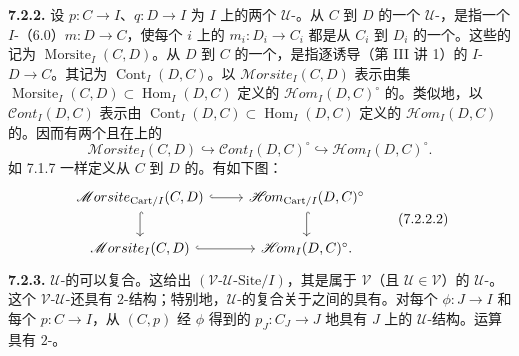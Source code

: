 \textbf{7.2.2.} 设 $p:C\to I$、$q:D\to I$ 为 $I$ 上的两个 $\mathcal U$-。从 $C$ 到 $D$ 的一个 $\mathcal U$-，是指一个 $I$-（6.0）$m:D\to C$，使每个 $i$ 上的 $m_i:D_i\to C_i$ 都是从 $C_i$ 到 $D_i$ 的一个。这些的记为 $\operatorname{Morsite}_I(C,D)$。从 $D$ 到 $C$ 的一个，是指逐诱导（第 III 讲 1）的 $I$- $D\to C$。其记为 $\operatorname{Cont}_I(D,C)$。以 $\mathscr{M}orsite_I(C,D)$ 表示由集 $\operatorname{Morsite}_I(C,D)\subset\operatorname{Hom}_I(D,C)$ 定义的 $\mathscr{H}\!om_I(D,C)^\circ$ 的。类似地，以 $\mathscr{C}ont_I(D,C)$ 表示由 $\operatorname{Cont}_I(D,C)\subset\operatorname{Hom}_I(D,C)$ 定义的 $\mathscr{H}\!om_I(D,C)$ 的。因而有两个且在上的
\[\mathscr{M}orsite_I(C,D)\hookrightarrow\mathscr{C}ont_I(D,C)^\circ\hookrightarrow\mathscr{H}\!om_I(D,C)^\circ.\tag{7.2.2.1}\]
如 7.1.7 一样定义从 $C$ 到 $D$ 的。有如下图：
\[\begin{tikzcd}
\mathscr{M}orsite_{\mathrm{Cart}/I}(C,D)\arrow[r,hook]\arrow[d,hook]&\mathscr{H}\!om_{\mathrm{Cart}/I}(D,C)^\circ\arrow[d,hook]\\
\mathscr{M}orsite_I(C,D)\arrow[r,hook]&\mathscr{H}\!om_I(D,C)^\circ.
\end{tikzcd}\tag{7.2.2.2}\]
\textbf{7.2.3.} $\mathcal U$-的可以复合。这给出 $(\mathcal V\text{-}\mathcal U\text{-}\mathrm{Site}/I)$，其是属于 $\mathcal V$（且 $\mathcal U\in\mathcal V$）的 $\mathcal U$-。
这个 $\mathcal V$-$\mathcal U$-还具有 $2$-结构；特别地，$\mathcal U$-的复合关于之间的具有。对每个 $\phi:J\to I$ 和每个 $p:C\to I$，从 $(C,p)$ 经 $\phi$ 得到的 $p_J:C_J\to J$ 地具有 $J$ 上的 $\mathcal U$-结构。运算具有 $2$-。

